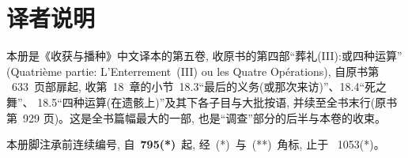 \documentclass[
    PaperSize=a4paper,
    HeadingFont=hei,
    Biblatex=false,
    BookTitleCN={收获与播种},
    Translator={数译},
    LogoFile=logo.pdf
]{mathtranslation}
\begin{document}
\frontmatter
\makecover

\chapter*{译者说明}

本册是《收获与播种》中文译本的第五卷, 收原书的第四部“葬礼(III):或四种运算”
(Quatrième partie: L'Enterrement~(III) ou les Quatre Opérations), 自原书第
~633~页部扉起, 收第~18~章的小节~18.3“最后的义务(或那次来访)”、18.4“死之舞”、
18.5“四种运算(在遗骸上)”及其下各子目与大批按语, 并续至全书末行(原书第~929
页)。这是全书篇幅最大的一部, 也是“调查”部分的后半与本卷的收束。

本册脚注承前连续编号, 自~\textbf{795(*)}~起, 经~(*)~与~(**)~角标, 止于
~1053(*)。

\CommonNoteBody

\makecontents

\mainmatter


\setcounter{chapter}{18}
\setcounter{section}{2}

\let\mtOrigPartdivider\partdivider
\renewcommand{\partdivider}[3]{%
  \mtOrigPartdivider{#1}{#2}{#3}%
  \phantomsection
  \addcontentsline{toc}{chapter}{18\quad 葬礼仪式}%
}


\let\partdivider\mtOrigPartdivider








\end{document}

